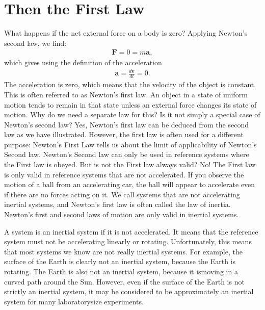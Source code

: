 \documentclass[letterpaper,10pt,english]{sphinxmanual}
\begin{document}
\section{Then the First Law}
\label{\detokenize{chapter1:then-the-first-law}}
What happens if the net external force on a body is zero? Applying Newton’s second
law, we find:
\begin{equation*}
\begin{split}
\boldsymbol{F} = 0 = m\boldsymbol{a},
\end{split}
\end{equation*}
which gives using the definition of the acceleration
\begin{equation*}
\begin{split}
\boldsymbol{a} = \frac{d\boldsymbol{v}}{dt}=0.
\end{split}
\end{equation*}
The acceleration is zero, which means that the velocity of the object is constant. This
is often referred to as Newton’s first law. An object in a state of uniform motion tends to remain in
that state unless an external force changes its state of motion.
Why do we need a separate law for this? Is it not simply a special case of Newton’s
second law? Yes, Newton’s first law can be deduced from the second law as we have
illustrated. However, the first law is often used for a different purpose: Newton’s
First Law tells us about the limit of applicability of Newton’s Second law. Newton’s
Second law can only be used in reference systems where the First law is obeyed. But
is not the First law always valid? No! The First law is only valid in reference systems
that are not accelerated. If you observe the motion of a ball from an accelerating
car, the ball will appear to accelerate even if there are no forces acting on it. We call
systems that are not accelerating inertial systems, and Newton’s first law is often
called the law of inertia. Newton’s first and second laws of motion are only valid in
inertial systems.

A system is an inertial system if it is not accelerated. It means that the reference system
must not be accelerating linearly or rotating. Unfortunately, this means that most
systems we know are not really inertial systems. For example, the surface of the
Earth is clearly not an inertial system, because the Earth is rotating. The Earth is also
not an inertial system, because it ismoving in a curved path around the Sun. However,
even if the surface of the Earth is not strictly an inertial system, it may be considered
to be approximately an inertial system for many laboratory\sphinxhyphen{}size experiments.
\end{document}
